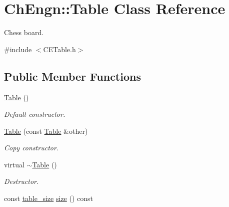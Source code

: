 \hypertarget{classChEngn_1_1Table}{
\section{ChEngn::Table Class Reference}
\label{classChEngn_1_1Table}
}


Chess board.  




{\ttfamily \#include $<$CETable.h$>$}

\subsection*{Public Member Functions}
\begin{DoxyCompactItemize}
\item 
\hypertarget{classChEngn_1_1Table_acca1b7e7ea3e28fc5aa33e3efd71dcd1}{
\hyperlink{classChEngn_1_1Table_acca1b7e7ea3e28fc5aa33e3efd71dcd1}{Table} ()}
\label{classChEngn_1_1Table_acca1b7e7ea3e28fc5aa33e3efd71dcd1}

\begin{DoxyCompactList}\small\item\em Default constructor. \item\end{DoxyCompactList}\item 
\hyperlink{classChEngn_1_1Table_a9ccad112470efda3d3b6cfe55341bf01}{Table} (const \hyperlink{classChEngn_1_1Table}{Table} \&other)
\begin{DoxyCompactList}\small\item\em Copy constructor. \item\end{DoxyCompactList}\item 
\hypertarget{classChEngn_1_1Table_a2fd42d65e704c471d11808d269bb97a7}{
virtual \hyperlink{classChEngn_1_1Table_a2fd42d65e704c471d11808d269bb97a7}{$\sim$Table} ()}
\label{classChEngn_1_1Table_a2fd42d65e704c471d11808d269bb97a7}

\begin{DoxyCompactList}\small\item\em Destructor. \item\end{DoxyCompactList}\item 
\hypertarget{classChEngn_1_1Table_a0dac8a3254790eda3ce920667e3cabbc}{
const \hyperlink{structChEngn_1_1table__size}{table\_\-size} \hyperlink{classChEngn_1_1Table_a0dac8a3254790eda3ce920667e3cabbc}{size} () const }
\label{classChEngn_1_1Table_a0dac8a3254790eda3ce920667e3cabbc}


\end{DoxyCompactItemize}
